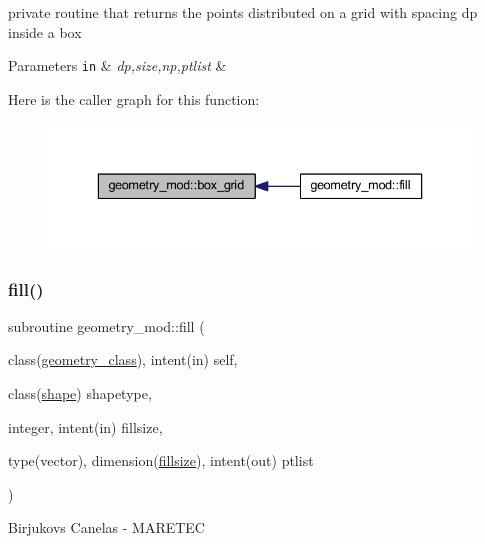 private routine that returns the points distributed on a grid with spacing dp inside a box 
\begin{DoxyParams}[1]{Parameters}
\mbox{\tt in}  & {\em dp,size,np,ptlist} & \\
\hline
\end{DoxyParams}
Here is the caller graph for this function\+:
\nopagebreak
\begin{figure}[H]
\begin{center}
\leavevmode
\includegraphics[width=336pt]{namespacegeometry__mod_ae87e4ecff2d21a839da2b82919b5fd0b_icgraph}
\end{center}
\end{figure}
\mbox{\label{namespacegeometry__mod_a095a8b47b3c23e154dcd31ab1441a065}} 
\subsubsection{\texorpdfstring{fill()}{fill()}}
{\footnotesize\ttfamily subroutine geometry\+\_\+mod\+::fill (\begin{DoxyParamCaption}\item[{class(\hyperlink{structgeometry__mod_1_1geometry__class}{geometry\+\_\+class}), intent(in)}]{self,  }\item[{class(\hyperlink{structgeometry__mod_1_1shape}{shape})}]{shapetype,  }\item[{integer, intent(in)}]{fillsize,  }\item[{type(vector), dimension(\hyperlink{namespacegeometry__mod_a92602e1198d3607613ea2722fb002685}{fillsize}), intent(out)}]{ptlist }\end{DoxyParamCaption})\hspace{0.3cm}{\ttfamily [private]}}



Birjukovs Canelas -\/ M\+A\+R\+E\+T\+EC 

